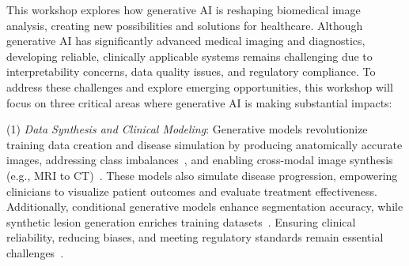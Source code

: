 \documentclass{article}
\begin{document}



This workshop explores how generative AI is reshaping biomedical image analysis, creating new possibilities and solutions for healthcare. Although generative AI has significantly advanced medical imaging and diagnostics, developing reliable, clinically applicable systems remains challenging due to interpretability concerns, data quality issues, and regulatory compliance.
%
To address these challenges and explore emerging opportunities, this workshop will focus on three critical areas where generative AI is making substantial impacts:

(1) \textit{Data Synthesis and Clinical Modeling}: 
%
Generative models revolutionize training data creation and disease simulation by producing anatomically accurate images, addressing class imbalances~\citep{chambon2022roentgen,wang2024self}, and enabling cross-modal image synthesis (e.g., MRI to CT)~\citep{gu2023biomedjourney}. 
%
These models also simulate disease progression, empowering clinicians to visualize patient outcomes and evaluate treatment effectiveness. 
%
Additionally, conditional generative models enhance segmentation accuracy, while synthetic lesion generation enriches training datasets~\citep{ktena2024generative}. 
%
Ensuring clinical reliability, reducing biases, and meeting regulatory standards remain essential challenges~\citep{hastings2024preventing}.
\end{document}
